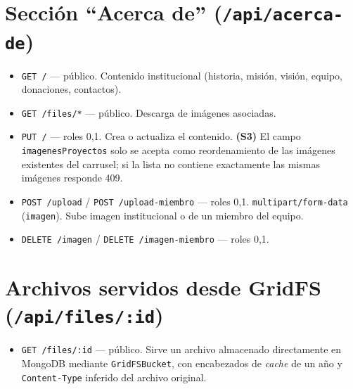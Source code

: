 \section{Sección ``Acerca de'' (\texttt{/api/acerca-de})}
\begin{itemize}
    \item \texttt{GET /} — público. Contenido institucional (historia, misión, visión, equipo, donaciones, contactos).
    \item \texttt{GET /files/*} — público. Descarga de imágenes asociadas.
    \item \texttt{PUT /} — roles 0,1. Crea o actualiza el contenido. \textbf{(S3)} El campo \texttt{imagenesProyectos} solo se acepta como reordenamiento de las imágenes existentes del carrusel; si la lista no contiene exactamente las mismas imágenes responde 409.
    \item \texttt{POST /upload} / \texttt{POST /upload-miembro} — roles 0,1. \texttt{multipart/form-data} (\texttt{imagen}). Sube imagen institucional o de un miembro del equipo.
    \item \texttt{DELETE /imagen} / \texttt{DELETE /imagen-miembro} — roles 0,1.
\end{itemize}

\section{Archivos servidos desde GridFS (\texttt{/api/files/:id})}
\begin{itemize}
    \item \texttt{GET /files/:id} — público. Sirve un archivo almacenado directamente en MongoDB mediante \texttt{GridFSBucket}, con encabezados de \textit{cache} de un año y \texttt{Content-Type} inferido del archivo original.
\end{itemize}

